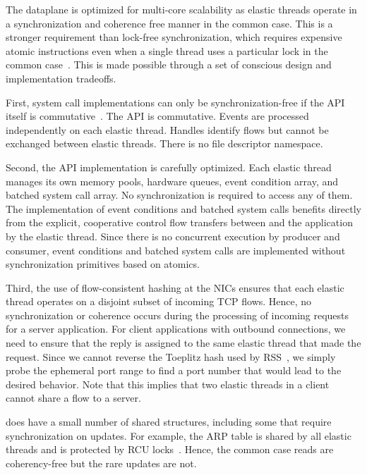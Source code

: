 The \ix dataplane is optimized for multi-core scalability as elastic
threads operate in a synchronization and coherence free manner in the
common case. This is a stronger requirement than lock-free
synchronization, which requires expensive atomic instructions even
when a single thread uses a particular lock in the common
case~\cite{DBLP:conf/sosp/DavidGT13}.  This is made possible through a
set of conscious design and implementation tradeoffs.

First, system call implementations can only be synchronization-free if
the API itself is
commutative~\cite{DBLP:conf/sosp/ClementsKZMK13}. The \ix API is
commutative. Events are processed independently on each elastic
thread. Handles identify flows but cannot be exchanged between elastic
threads. There is no file descriptor namespace.

Second, the API implementation is carefully optimized.  Each elastic
thread manages its own memory pools, hardware queues, event condition
array, and batched system call array. No synchronization is required
to access any of them. The implementation of event conditions and
batched system calls benefits directly from the explicit, cooperative
control flow transfers between \ix and the application by the elastic
thread.  Since there is no concurrent execution by producer and
consumer, event conditions and batched system calls are implemented
without synchronization primitives based on atomics.

Third, the use of flow-consistent hashing at the NICs ensures that
each elastic thread operates on a disjoint subset of incoming TCP
flows. Hence, no synchronization or coherence occurs during the
processing of incoming requests for a server application. For client
applications with outbound connections, we need to ensure that the
reply is assigned to the same elastic thread that made the
request. Since we cannot reverse the Toeplitz hash used by
RSS~\cite{url:rss}, we simply probe the ephemeral port range to find a
port number that would lead to the desired behavior. Note that this
implies that two elastic threads in a client cannot share a flow to a
server.


\ix does have a small number of shared structures, including some that
require synchronization on updates.  For example, the ARP table is
shared by all elastic threads and is protected by RCU
locks~\cite{mckenney1998read}. Hence, the common case reads are
coherency-free but the rare updates are not.
%

